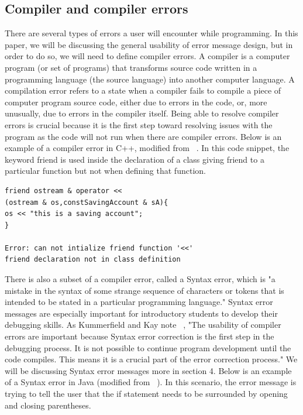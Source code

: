 \documentclass{sig-alternate}
\begin{document}


\subsection{Compiler and compiler errors}

There are several types of errors a user will encounter while programming. In this paper, we will be discussing the general usability of error message design, but in order to do so, we will need to define compiler errors. A compiler is a computer program (or set of programs) that transforms source code written in a programming language (the source language) into another computer language.  A compilation error refers to a state when a compiler fails to compile a piece of computer program source code, either due to errors in the code, or, more unusually, due to errors in the compiler itself. Being able to resolve compiler errors is crucial because it is the first step toward resolving issues with the program as the code will not run when there are compiler errors. Below is an example of a compiler error in C++, modified from ~\cite{Traver:2010}. In this code snippet, the keyword friend is used inside the declaration of a class giving friend to a particular function but not when defining that function. 

\begin{verbatim}
friend ostream & operator << 
(ostream & os,constSavingAccount & sA){
os << "this is a saving account";
}

Error: can not intialize friend function '<<' 
friend declaration not in class definition
\end{verbatim}

There is also a subset of a compiler error, called a Syntax error, which is "a mistake in the syntax of some strange sequence of characters or tokens that is intended to be stated in a particular programming language." Syntax error messages are especially important for introductory students to develop their debugging skills. As Kummerfield and Kay note ~\cite{Kummerfeld:2003:NBF:858403.858416}, "The usability of compiler errors are important because Syntax error correction is the first step in the debugging process. It is not possible to continue program development until the code compiles. This means it is a crucial part of the error correction process." We will be discussing Syntax error messages more in section 4. Below is an example of a Syntax error in Java (modified from ~\cite{Denny:2014:ESE:2591708.2591748}). In this scenario, the error message is trying to tell the user that the if statement needs to be surrounded by opening and closing parentheses.
\end{document}
